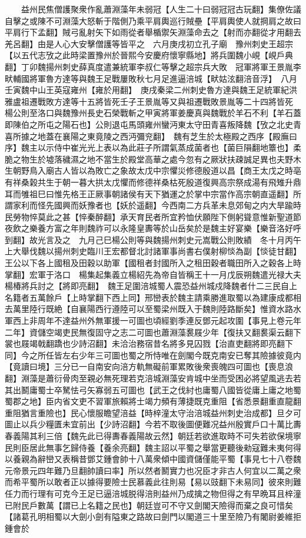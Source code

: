 　　益州民焦僧護聚衆作亂蕭淵藻年未弱冠【人生二十曰弱冠冠古玩翻】集僚佐議自擊之或陳不可淵藻大怒斬于階側乃乘平肩輿巡行賊壘【平肩輿使人就掆肩之故曰平肩行下孟翻】賊弓亂射矢下如雨從者舉楯禦矢淵藻命去之【射而亦翻從才用翻去羌呂翻】由是人心大安擊僧護等皆平之　六月庚戌初立孔子廟　豫州刺史王超宗【以五代志攷之此時梁置豫州於晉熙今安慶府懷寧縣地】將兵圍魏小峴【峴戶典翻】丁卯魏揚州刺史薛真度遣兼統軍李叔仁等擊之超宗兵大敗　冠軍將軍王景胤李畎輔國將軍魯方達等與魏王足戰屢敗秋七月足進逼涪城【畎姑泫翻涪音浮】　八月壬寅魏中山王英寇雍州【雍於用翻】　庚戌秦梁二州刺史魯方達與魏王足統軍紀洪雅盧祖遷戰敗方達等十五將皆死壬子王景胤等又與祖遷戰敗景胤等二十四將皆死　楊公則至洛口與魏豫州長史石榮戰斬之甲寅將軍姜慶真與魏戰於羊石不利【羊石蓋即陳伯之所屯之陽石也】公則退屯馬頭雍州蠻沔東太守田青喜叛降魏【攷之北史青喜所據之地蓋在襄陽之東竟陵之西沔彌兖翻】　魏有芝生於太極殿之西序【殿廡曰序】魏主以示侍中崔光光上表以為此莊子所謂氣蒸成菌者也【菌巨隕翻地簟也】柔脆之物生於墟落穢濕之地不當生於殿堂高華之處今忽有之厥狀扶疎誠足異也夫野木生朝野鳥入廟古人皆以為敗亡之象故太戊中宗懼災修德殷道以昌【商王太戊之時亳有祥桑榖共生于朝一暮大拱太戊懼而修德祥桑枯死殷道復興高宗祭成湯有飛雉升鼎耳而雊祖巳曰惟先格王正厥事朝諸侯有天下猶運之於掌中宗當作高宗朝直遥翻】所謂家利而怪先國興而妖豫者也【妖於遥翻】今西南二方兵革未息郊甸之内大旱踰時民勞物悴莫此之甚【悴秦醉翻】承天育民者所宜矜恤伏願陛下側躬聳意惟新聖道節夜飲之樂養方富之年則魏祚可以永隆皇夀等於山岳矣於是魏主好宴樂【樂音洛好呼到翻】故光言及之　九月己巳楊公則等與魏揚州刺史元嵩戰公則敗績　冬十月丙午上大舉伐魏以揚州刺史臨川王宏都督北討諸軍事尚書右僕射柳惔為副【惔徒甘翻】王公以下各上國租及田穀以助軍【國租者封國所入之租田穀者職田所入之穀各上時掌翻】宏軍于洛口　楊集起集義立楊紹先為帝自皆稱王十一月戊辰朔魏遣光禄大夫楊椿將兵討之【將即亮翻】　魏王足圍涪城蜀人震恐益州城戍降魏者什二三民自上名籍者五萬餘戶【上時掌翻下西上同】邢巒表於魏主請乘勝進取蜀以為建康成都相去萬里陸行既絶【自襄陽西行遵陸可以至蜀梁州既入于魏則陸路斷矣】惟資水路水軍西上非周年不達益州外無軍援一可圖也頃經劉季連反鄧元起攻圍【事見上卷元年二年】資儲空竭吏民無復固守之志二可圖也蕭淵藻裠屐少年【復扶又翻裠渠云翻下裳也屐竭戟翻蹻也少詩沼翻】未洽治務宿昔名將多見囚戮【治直吏翻將即亮翻下同】今之所任皆左右少年三可圖也蜀之所恃唯在劍閣今既克南安已奪其險據彼竟内【竟讀曰境】三分已一自南安向涪方軌無礙前軍累敗後衆喪魄四可圖也【喪息浪翻】淵藻是蕭衍骨肉至親必無死理若克涪城淵藻安肯城中坐而受困必將望風逃去若其出鬭庸蜀士卒駑怯弓矢寡弱五可圖也【武王之伐紂也庸蜀八國皆從庸上庸之地蜀蜀郡之地】臣内省文吏不習軍旅賴將士竭力頻有薄捷既克重阻【省悉景翻重直龍翻重阻猶言重險也】民心懷服瞻望涪益【時梓潼太守治涪城益州刺史治成都】旦夕可圖止以兵少糧匱未宜前出【少詩沼翻】今若不取後圖便難况益州殷實戶口十萬比夀春義陽其利三倍【魏先此已得夀春義陽故云然】朝廷若欲進取時不可失若欲保境寧民則臣居此無事乞歸侍養【養余亮翻】魏主詔以平蜀之舉當更聽後勑寇難未夷何得以養親為辭巒又表稱昔鄧艾鍾會帥十八萬衆傾中國資儲僅能平蜀【事見七十八卷魏元帝景元四年難乃旦翻帥讀曰率】所以然者鬭實力也况臣才非古人何宜以二萬之衆而希平蜀所以敢者正以據得要險士民慕義此往則易【易以豉翻下未易同】彼來則難任力而行理有可克今王足已逼涪城脱得涪則益州乃成擒之物但得之有早晩耳且梓潼已附民戶數萬【謂已上名籍之民也】朝廷豈可不守又劍閣天險得而棄之良可惜矣【諸葛孔明相蜀以大劍小劍有隘東之路故曰劍門以閣道三十里至險乃有闍尉姜維拒鍾會於